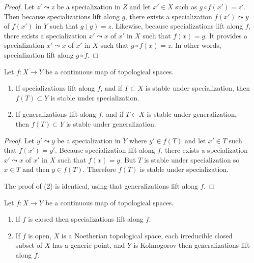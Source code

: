 \begin{proof}
Let $z'\leadsto z$ be a specialization in $Z$ and let $x' \in X$ such as
$g\circ f (x') = z'$. Then because specializations lift along $g$, there exists
a specialization $f(x') \leadsto y$ of $f(x')$ in $Y$ such that $g(y) = z$.
Likewise, because specializations lift along $f$, there exists a specialization
$x' \leadsto x$ of $x'$ in $X$ such that $f(x) = y$. It provides a
specialization $x' \leadsto x$ of $x'$ in $X$ such that $g\circ f(x) = z$. In
other words, specialization lift along $g\circ f$.
\end{proof}

\begin{lemma}
\label{lemma-lift-specializations-images}
Let $f : X \to Y$ be a continuous map of topological spaces.
\begin{enumerate}
\item If specializations lift along $f$, and if $T \subset X$
is stable under specialization, then $f(T) \subset Y$ is
stable under specialization.
\item If generalizations lift along $f$, and if $T \subset X$
is stable under generalization, then $f(T) \subset Y$ is
stable under generalization.
\end{enumerate}
\end{lemma}

\begin{proof}
Let $y' \leadsto y$ be a specialization in $Y$ where $y'\in f(T)$ and let
$x'\in T$ such that $f(x') = y'$. Because specialization lift along $f$, there
exists a specialization $x'\leadsto x$ of $x'$ in $X$ such that $f(x) = y$. But
$T$ is stable under specialization so $x\in T$ and then $y \in f(T)$. Therefore
$f(T)$ is stable under specialization.

\medskip\noindent
The proof of (2) is identical, using that generalizations lift along $f$.
\end{proof}

\begin{lemma}
\label{lemma-closed-open-map-specialization}
Let $f : X \to Y$ be a continuous map of topological spaces.
\begin{enumerate}
\item If $f$ is closed then specializations lift along $f$.
\item If $f$ is open, $X$ is a Noetherian topological space,
each irreducible closed subset of $X$ has a generic point,
and $Y$ is Kolmogorov then generalizations lift along $f$.
\end{enumerate}
\end{lemma}

